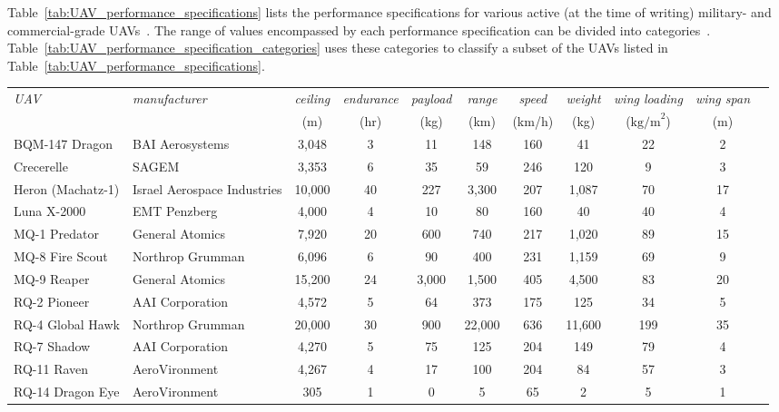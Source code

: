 Table~\ref{tab:UAV_performance_specifications} lists the performance specifications for various active (at the time of writing) military- and commercial-grade UAVs~\cite{Arjomandi,AscTec,Draganfly,Parrot}. The range of values encompassed by each performance specification can be divided into categories~\cite{Arjomandi}. Table~\ref{tab:UAV_performance_specification_categories} uses these categories to classify a subset of the UAVs listed in Table~\ref{tab:UAV_performance_specifications}.

\begin{table}
	\centering
	\renewcommand*\arraystretch{1.3}
	\begin{tabular}{ l l | c c c c c c c c c }
		\multirow{2}{*}{\emph{UAV}} &
			\multirow{2}{*}{\emph{manufacturer}} &
			\emph{ceiling} &
			\emph{endurance} &
			\emph{payload} &
			\emph{range} &
			\emph{speed} &
			\emph{weight} &
			\emph{wing loading} &
			\emph{wing span}\\
			& & (m) & (hr) & (kg) & (km) & (km/h) & (kg) & ($\textrm{kg/m}^2$) & (m)\\
		\hline
		BQM-147 Dragon & BAI Aerosystems & 3,048 & 3 & 11 & 148 & 160 & 41 & 22 & 2\\
		Crecerelle & SAGEM & 3,353 & 6 & 35 & 59 & 246 & 120 & 9 & 3\\
		Heron (Machatz-1) & Israel Aerospace Industries & 10,000 & 40 & 227 & 3,300 & 207 & 1,087 & 70 & 17\\
		Luna X-2000 & EMT Penzberg & 4,000 & 4 & 10 & 80 & 160 & 40 & 40 & 4\\
		MQ-1 Predator & General Atomics & 7,920 & 20 & 600 & 740 & 217 & 1,020 & 89 & 15\\
		MQ-8 Fire Scout & Northrop Grumman & 6,096 & 6 & 90 & 400 & 231 & 1,159 & 69 & 9\\
		MQ-9 Reaper & General Atomics & 15,200 & 24 & 3,000 & 1,500 & 405 & 4,500 & 83 & 20\\
		RQ-2 Pioneer & AAI Corporation & 4,572 & 5 & 64 & 373 & 175 & 125 & 34 & 5\\
		RQ-4 Global Hawk & Northrop Grumman & 20,000 & 30 & 900 & 22,000 & 636 & 11,600 & 199 & 35\\
		RQ-7 Shadow & AAI Corporation & 4,270 & 5 & 75 & 125 & 204 & 149 & 79 & 4\\
		RQ-11 Raven & AeroVironment & 4,267 & 4 & 17 & 100 & 204 & 84 & 57 & 3\\
		RQ-14 Dragon Eye & AeroVironment & 305 & 1 & 0 & 5 & 65 & 2 & 5 & 1\\

\end{tabular}
\end{table}
